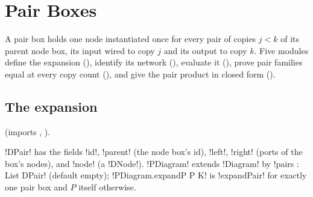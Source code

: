 {\section{Pair Boxes}\label{sec:boxes-pair}

A pair box holds one node instantiated once for every pair of copies $j<k$ of its parent node box, its input wired to copy $j$ and its output to copy $k$. Five modules define the expansion (), identify its network (), evaluate it (), prove pair families equal at every copy count (), and give the pair product in closed form ().

\subsection{The expansion}

 (imports , ).

\begin{definition}\label{def:boxes-dpair}
\lbx!DPair! has the fields \lbx!id!, \lbx!parent! (the node box's id), \lbx!left!, \lbx!right! (ports of the box's nodes), and \lbx!node! (a \lbx!DNode!). \lbx!PDiagram! extends \lbx!Diagram! by \lbx!pairs : List DPair! (default empty); \lbx!PDiagram.expandP P K! is \lbx!expandPair! for exactly one pair box and $P$ itself otherwise.
\end{definition}

}
